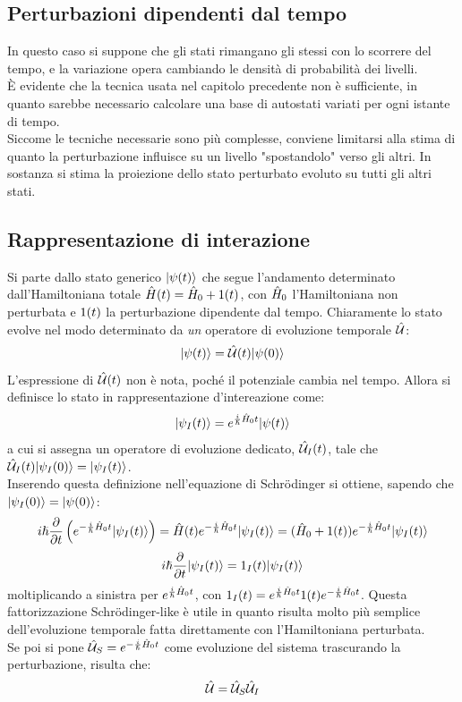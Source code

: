 \subsection{Perturbazioni dipendenti dal tempo}
In questo caso si suppone che gli stati rimangano gli stessi con lo scorrere del tempo, e la variazione opera cambiando le densità di probabilità dei livelli.\\
È evidente che la tecnica usata nel capitolo precedente non è sufficiente, in quanto sarebbe necessario calcolare una base di autostati variati per ogni istante di tempo.\\
Siccome le tecniche necessarie sono più complesse, conviene limitarsi alla stima di quanto la perturbazione influisce su un livello "spostandolo" verso gli altri. In sostanza si stima la proiezione dello stato perturbato evoluto su tutti gli altri stati.

\subsection{Rappresentazione di interazione}
Si parte dallo stato generico $\Ket{\psi(t)}$ che segue l'andamento determinato dall'Hamiltoniana totale $\H(t) = \H_0 + \V(t)$, con $\H_0$ l'Hamiltoniana non perturbata e $\V(t)$ la perturbazione dipendente dal tempo. Chiaramente lo stato evolve nel modo determinato da \textit{un} operatore di evoluzione temporale $\U$:
\[
    \Ket{\psi(t)} = \U(t) \Ket{\psi(0)}
\]
L'espressione di $\U(t)$ non è nota, poché il potenziale cambia nel tempo. Allora si definisce lo stato in rappresentazione d'intereazione come:
\[
    \Ket{\psi_I(t)} = e^{\frac{i}{\hslash} \H_0 t} \Ket{\psi(t)}
\]
a cui si assegna un operatore di evoluzione dedicato, $\U_I(t)$, tale che $\U_I(t)\Ket{\psi_I(0)} = \Ket{\psi_I(t)}$.\\
Inserendo questa definizione nell'equazione di Schrödinger si ottiene, sapendo che $\Ket {\psi_I(0)} = \Ket {\psi(0)}$:
\[
    i \hslash \tderiv{} \left( e^{-\frac{i}{\hslash} \H_0 t}\Ket{\psi_I(t)} \right) = \H(t) e^{-\frac{i}{\hslash} \H_0 t}\Ket{\psi_I(t)} = (\H_0 + \V(t)) e^{-\frac{i}{\hslash} \H_0 t}\Ket{\psi_I(t)} \]\[
    i \hslash \tderiv{} \Ket{\psi_I(t)} = \V_I(t) \Ket{\psi_I(t)}
\]
moltiplicando a sinistra per $e^{\frac{i}{\hslash} \H_0 t}$, con $\V_I(t) = e^{\frac{i}{\hslash} \H_0 t} \V(t) e^{-\frac{i}{\hslash} \H_0 t}$. Questa fattorizzazione Schrödinger-like è utile in quanto risulta molto più semplice dell'evoluzione temporale fatta direttamente con l'Hamiltoniana perturbata.\\
Se poi si pone $\U_S = e^{-\frac{i}{\hslash} \H_0 t}$ come evoluzione del sistema trascurando la perturbazione, risulta che:
\[
    \U = \U_S \U_I
\]

